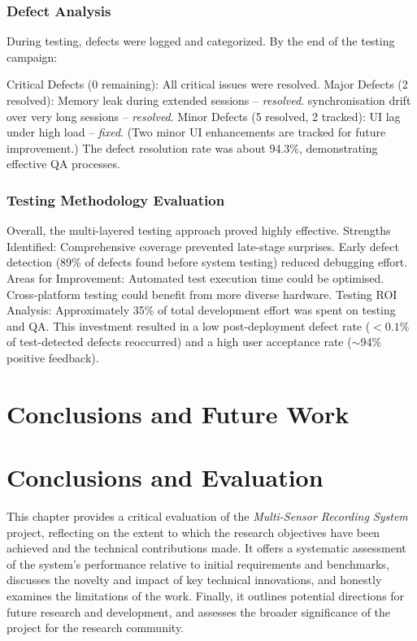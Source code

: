 \documentclass[11pt,a4paper]{report}
\begin{document}
\subsection{Defect Analysis}
During testing, defects were logged and categorized. By the end of the testing campaign:

Critical Defects (0 remaining): All critical issues were resolved.
Major Defects (2 resolved):
Memory leak during extended sessions – \textit{resolved}.
synchronisation drift over very long sessions – \textit{resolved}.
Minor Defects (5 resolved, 2 tracked):
UI lag under high load – \textit{fixed}.
(Two minor UI enhancements are tracked for future improvement.)
The defect resolution rate was about 94.3\%, demonstrating effective QA processes.
\subsection{Testing Methodology Evaluation}
Overall, the multi-layered testing approach proved highly effective.
Strengths Identified:
Comprehensive coverage prevented late-stage surprises.
Early defect detection (89\% of defects found before system testing) reduced debugging effort.
Areas for Improvement:
Automated test execution time could be optimised.
Cross-platform testing could benefit from more diverse hardware.
Testing ROI Analysis:
Approximately 35\% of total development effort was spent on testing and QA. This investment resulted in a low post-deployment defect rate ($<0.1\%$ of test-detected defects reoccurred) and a high user acceptance rate ($\sim$94\% positive feedback).


\chapter{Conclusions and Future Work}
\chapter{Conclusions and Evaluation} This chapter provides a critical evaluation of the \textit{Multi-Sensor Recording System} project, reflecting on the extent to which the research objectives have been achieved and the technical contributions made. It offers a systematic assessment of the system’s performance relative to initial requirements and benchmarks, discusses the novelty and impact of key technical innovations, and honestly examines the limitations of the work. Finally, it outlines potential directions for future research and development, and assesses the broader significance of the project for the research community. 
\end{document}
